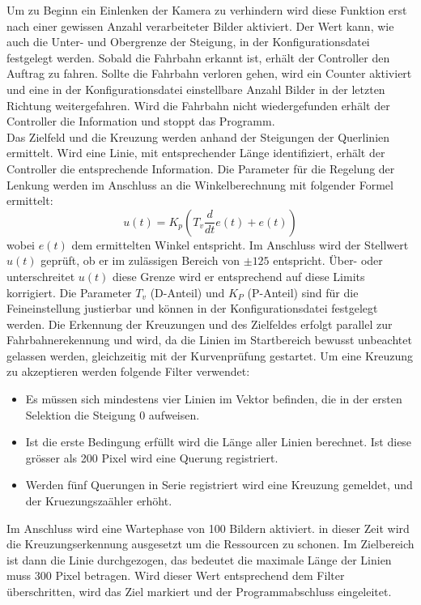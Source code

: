Um zu Beginn ein Einlenken der Kamera zu verhindern wird diese Funktion erst nach einer gewissen Anzahl verarbeiteter Bilder aktiviert. Der Wert kann, wie auch die Unter- und Obergrenze der Steigung, in der Konfigurationsdatei festgelegt werden. 
Sobald die Fahrbahn erkannt ist, erhält der Controller den Auftrag zu fahren. Sollte die Fahrbahn verloren gehen, wird ein Counter aktiviert und eine in der Konfigurationsdatei einstellbare Anzahl Bilder in der letzten Richtung weitergefahren. Wird die Fahrbahn nicht wiedergefunden erhält der Controller die Information und stoppt das Programm.\\
Das Zielfeld und die Kreuzung werden anhand der Steigungen der Querlinien ermittelt. Wird eine Linie, mit entsprechender Länge identifiziert, erhält der Controller die entsprechende Information.
Die Parameter für die Regelung der Lenkung werden im Anschluss an die Winkelberechnung mit folgender Formel ermittelt:
\[
u(t) = K_p\left(T_v\frac{d}{dt}e(t) + e(t)\right)
\]
wobei $e(t)$ dem ermittelten Winkel entspricht. Im Anschluss wird der Stellwert $u(t)$ geprüft, ob er im zulässigen Bereich von $\pm 125$ entspricht. Über- oder unterschreitet $u(t)$ diese Grenze wird er entsprechend auf diese Limits korrigiert. Die Parameter $T_v$ (D-Anteil) und $K_{P}$ (P-Anteil) sind für die Feineinstellung justierbar und können in der Konfigurationsdatei festgelegt werden.
Die Erkennung der Kreuzungen und des Zielfeldes erfolgt parallel zur Fahrbahnerekennung und wird, da die Linien im Startbereich bewusst unbeachtet gelassen werden, gleichzeitig mit der Kurvenprüfung gestartet. Um eine Kreuzung zu akzeptieren werden folgende Filter verwendet:
\begin{itemize}
\item Es müssen sich mindestens vier Linien im Vektor befinden, die in der ersten Selektion die Steigung 0 aufweisen.
\item Ist die erste Bedingung erfüllt wird die Länge aller Linien berechnet. Ist diese grösser als 200 Pixel wird eine Querung registriert.
\item Werden fünf Querungen in Serie registriert wird eine Kreuzung gemeldet, und der Kruezungszaähler erhöht.
\end{itemize}
Im Anschluss wird eine Wartephase von 100 Bildern aktiviert. in dieser Zeit wird die Kreuzungserkennung ausgesetzt um die Ressourcen zu schonen. Im Zielbereich ist dann die Linie durchgezogen, das bedeutet die maximale Länge der Linien muss 300 Pixel betragen. Wird dieser Wert entsprechend dem Filter überschritten, wird das Ziel markiert und der Programmabschluss eingeleitet.\\[0.2cm]
